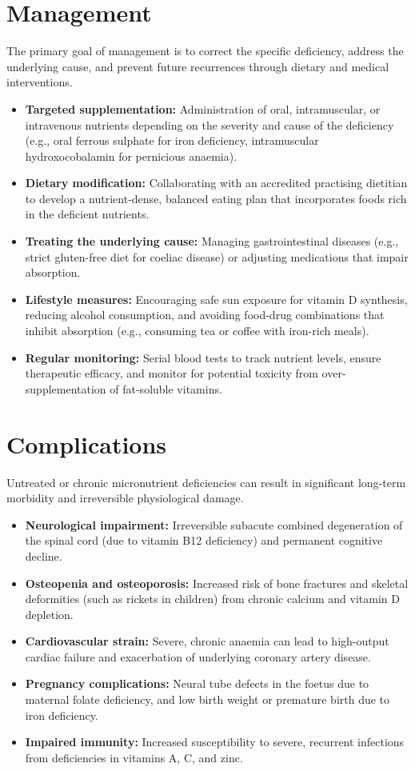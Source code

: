 \section*{Management}
The primary goal of management is to correct the specific deficiency, address the underlying cause, and prevent future recurrences through dietary and medical interventions.
\begin{itemize}
    \item \textbf{Targeted supplementation:} Administration of oral, intramuscular, or intravenous nutrients depending on the severity and cause of the deficiency (e.g., oral ferrous sulphate for iron deficiency, intramuscular hydroxocobalamin for pernicious anaemia).
    \item \textbf{Dietary modification:} Collaborating with an accredited practising dietitian to develop a nutrient-dense, balanced eating plan that incorporates foods rich in the deficient nutrients.
    \item \textbf{Treating the underlying cause:} Managing gastrointestinal diseases (e.g., strict gluten-free diet for coeliac disease) or adjusting medications that impair absorption.
    \item \textbf{Lifestyle measures:} Encouraging safe sun exposure for vitamin D synthesis, reducing alcohol consumption, and avoiding food-drug combinations that inhibit absorption (e.g., consuming tea or coffee with iron-rich meals).
    \item \textbf{Regular monitoring:} Serial blood tests to track nutrient levels, ensure therapeutic efficacy, and monitor for potential toxicity from over-supplementation of fat-soluble vitamins.
\end{itemize}

\section*{Complications}
Untreated or chronic micronutrient deficiencies can result in significant long-term morbidity and irreversible physiological damage.
\begin{itemize}
    \item \textbf{Neurological impairment:} Irreversible subacute combined degeneration of the spinal cord (due to vitamin B12 deficiency) and permanent cognitive decline.
    \item \textbf{Osteopenia and osteoporosis:} Increased risk of bone fractures and skeletal deformities (such as rickets in children) from chronic calcium and vitamin D depletion.
    \item \textbf{Cardiovascular strain:} Severe, chronic anaemia can lead to high-output cardiac failure and exacerbation of underlying coronary artery disease.
    \item \textbf{Pregnancy complications:} Neural tube defects in the foetus due to maternal folate deficiency, and low birth weight or premature birth due to iron deficiency.
    \item \textbf{Impaired immunity:} Increased susceptibility to severe, recurrent infections from deficiencies in vitamins A, C, and zinc.
\end{itemize}


